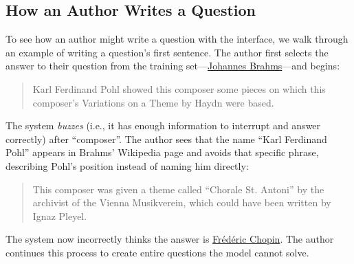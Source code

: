 \subsection{How an Author Writes a Question}

To see how an author might write a question with the interface, we walk
through an example of writing a question's first sentence. The
author first selects the answer to their question from the training
set---\underline{Johannes
Brahms}---and begins:
\begin{quote} Karl Ferdinand Pohl showed this composer some pieces on which
  this composer's Variations on a Theme by Haydn were based. \end{quote}
The  system \emph{buzzes} (i.e., it has enough information to
interrupt and answer correctly) after 
``composer''. The author sees that the name ``Karl
Ferdinand Pohl'' appears in Brahms' Wikipedia page and avoids
 that specific phrase, describing Pohl's
position instead of naming him directly:
\begin{quote} This composer was given a theme called ``Chorale St. Antoni'' by the
  archivist of the Vienna Musikverein, which could have been written
  by Ignaz Pleyel.\end{quote}
The  system now incorrectly thinks the answer is
\underline{Fr\'ed\'eric Chopin}.  The author continues this process to
create entire questions the model cannot solve.
